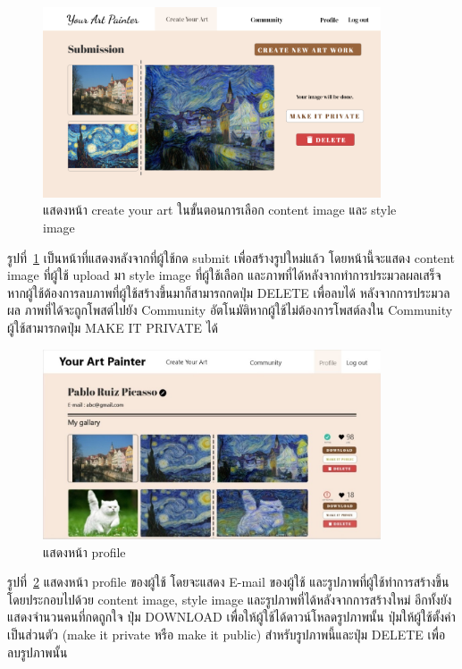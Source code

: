 \documentclass[12pt,oneside,openright,a4paper]{cpe-thai-project}
\begin{document}
\newpage
\begin{figure}[!h]
  \centering
  \includegraphics[width=10cm]{./image/ui-create2.png}
  \caption{แสดงหน้า create your art ในขั้นตอนการเลือก content image และ style image}
  \label{fig:ui-create2}
\end{figure}
\par\setlength{\parindent}{5ex}
รูปที่~\ref{fig:ui-create2} เป็นหน้าที่แสดงหลังจากที่ผู้ใช้กด submit เพื่อสร้างรูปใหม่แล้ว โดยหน้านี้จะแสดง content image ที่ผู้ใช้ upload มา style image ที่ผู้ใช้เลือก และภาพที่ได้หลังจากทำการประมวลผลเสร็จ หากผู้ใช้ต้องการลบภาพที่ผู้ใช้สร้างขึ้นมาก็สามารถกดปุ่ม DELETE เพื่อลบได้ หลังจากการประมวลผล ภาพที่ได้จะถูกโพสต์ไปยัง Community อัตโนมัติหากผู้ใช้ไม่ต้องการโพสต์ลงใน Community ผู้ใช้สามารกดปุ่ม MAKE IT PRIVATE ได้

\begin{figure}[!h]
  \centering
  \includegraphics[width=10cm]{./image/ui-profile.jpg}
  \caption{แสดงหน้า profile}
  \label{fig:ui-profile}
\end{figure}

\par\setlength{\parindent}{5ex}
รูปที่~\ref{fig:ui-profile} แสดงหน้า profile ของผู้ใช้ โดยจะแสดง E-mail ของผู้ใช้ และรูปภาพที่ผู้ใช้ทำการสร้างขึ้น โดยประกอบไปด้วย content image, style image และรูปภาพที่ได้หลังจากการสร้างใหม่ อีกทั้งยังแสดงจำนวนคนที่กดถูกใจ ปุ่ม DOWNLOAD เพื่อให้ผู้ใช้ได้ดาวน์โหลดรูปภาพนั้น ปุ่มให้ผู้ใช้ตั้งค่าเป็นส่วนตัว (make it private หรือ make it public) สำหรับรูปภาพนี้และปุ่ม DELETE เพื่อลบรูปภาพนั้น
\end{document}
